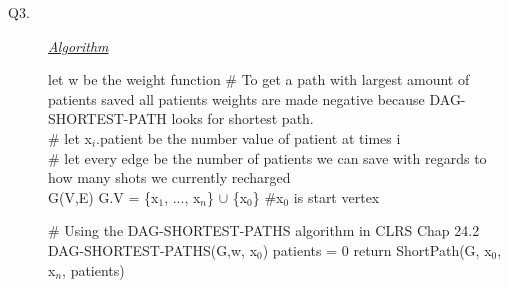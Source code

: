 \documentclass[10pt]{csc_assignment}
\begin{document}
\begin{description}

\newpage
\item[Q3.]


\emph{\underline{Algorithm}}\\
\begin{algorithm}[H]
 \LinesNumbered 
let w be the weight function\;
\# To get a path with largest amount of patients saved all patients weights are made negative because DAG-SHORTEST-PATH looks for shortest path.\\
\# let x$_{i}$.patient be the number value of patient at times i\\
\# let every edge be the number of patients we can save with regards to how many shots we currently recharged\\
G(V,E)\;
G.V = \{x$_{1}$, ..., x$_{n}$\} $\cup$ \{x$_{0}$\} \#x$_{0}$ is start vertex\;

 \# Using the DAG-SHORTEST-PATHS algorithm in CLRS Chap 24.2 \\
DAG-SHORTEST-PATHS(G,w, x$_{0}$)\;
patients = 0\;
return ShortPath(G, x$_{0}$, x$_{n}$, patients)\;
\end{algorithm}


\LinesNumbered
\begin{algorithm}[H]
\end{algorithm}


\end{description}
\end{document}
